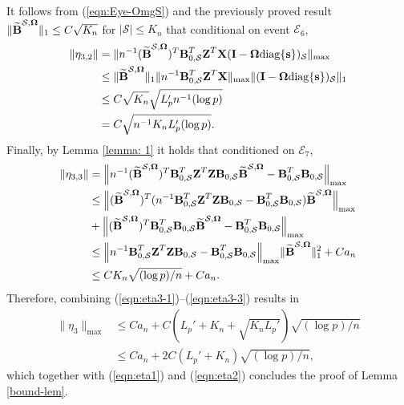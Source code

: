 \documentclass[11pt]{article}
\newcommand{\bs}{\mbox{\bf s}}
\newcommand{\bB}{\mbox{\bf B}}
\newcommand{\bI}{\mbox{\bf I}}
\newcommand{\bX}{\mbox{\bf X}}
\newcommand{\bZ}{\mbox{\bf Z}}
\newcommand{\bOmg}{\mbox{\boldmath $\Omega$}}
\newcommand{\sbOmg}{\mbox{\scriptsize\boldmath $\Omega$}}
\newcommand{\diag}{\mathrm{diag}}
\begin{document}
It follows from (\ref{eqn:Eye-OmgS}) and the previously proved result $\| \widetilde{\bB}^{\mathcal{S}, \sbOmg} \|_{1}
\le C \sqrt{K_n}$ for $|\mathcal{S}| \le K_n$ that conditional on event $\mathcal{E}_{6}$,
\begin{align}
\| \eta_{3,2}\| & = \| n^{-1} ( \widetilde{\bB}^{\mathcal{S}, \sbOmg} )^{T} \bB_{0,\mathcal{S}}^{T} \bZ^{T} \bX( \bI- \bOmg\diag\{\bs\})_{\mathcal S} \|_{\max}
\nonumber \\
& \leq
\|  \widetilde{\bB}^{\mathcal{S}, \sbOmg} \|_{1}
\| n^{-1} \bB_{0,\mathcal{S}}^{T} \bZ^{T} \bX \|_{\max}
\| ( \bI- \bOmg\diag\{\bs\})_{\mathcal S} \|_{1}
\nonumber \\
& \leq
C \sqrt{K_n} \sqrt{ L_p'n^{-1} (\log p)}
\nonumber \\
& =
C  \sqrt{n^{-1} K_n L_p'(\log p)}. \label{eqn:eta3-2}
\end{align}
Finally, by Lemma \ref{lemma: 1} it holds that conditioned on $\mathcal{E}_{7}$,
\begin{align}
\| \eta_{3,3}\| & =  \Big\| n^{-1}
( \widetilde{\bB}^{\mathcal{S}, \sbOmg} )^{T} \bB_{0,\mathcal{S}}^{T} \bZ^{T} \bZ\bB_{0,\mathcal{S}}\widetilde{\bB}^{\mathcal{S}, \sbOmg} - \bB_{0,\mathcal{S}}^T \bB_{0,\mathcal{S}} \Big\|_{\max}
\nonumber \\
& \leq
\Big\|
( \widetilde{\bB}^{\mathcal{S}, \sbOmg} )^{T}
(n^{-1} \bB_{0,\mathcal{S}}^{T} \bZ^{T} \bZ \bB_{0,\mathcal{S}} - \bB_{0,\mathcal{S}}^T \bB_{0,\mathcal{S}}) \widetilde{\bB}^{\mathcal{S}, \sbOmg} \Big\|_{\max}
\nonumber \\ & +
\Big\|
( \widetilde{\bB}^{\mathcal{S}, \sbOmg} )^{T} \bB_{0,\mathcal{S}}^{T} \bB_{0,\mathcal{S}}\widetilde{\bB}^{\mathcal{S}, \sbOmg} - \bB_{0,\mathcal{S}}^T \bB_{0,\mathcal{S}} \Big\|_{\max}
\nonumber \\
& \leq
\Big\|
n^{-1} \bB_{0,\mathcal{S}}^{T} \bZ^{T} \bZ \bB_{0,\mathcal{S}} - \bB_{0,\mathcal{S}}^T \bB_{0,\mathcal{S}} \Big\|_{\max}
\| \widetilde{\bB}^{\mathcal{S}, \sbOmg} \|_{1}^{2}
+ C a_{n}
\nonumber \\
& \leq
C  K_n\sqrt{(\log p)/n}
+ C a_{n}. \label{eqn:eta3-3}
\end{align}
Therefore, combining (\ref{eqn:eta3-1})--(\ref{eqn:eta3-3}) results in
\begin{align*}
\| \eta_{3} \|_{\max} & \leq Ca_n + C(L_{p}' + K_n + \sqrt{K_nL_p'}) \sqrt{(\log p)/n} \\
& \leq  Ca_n + 2C(L_{p}' + K_n) \sqrt{(\log p)/n},
\end{align*}
which together with (\ref{eqn:eta1}) and (\ref{eqn:eta2}) concludes the proof of Lemma \ref{bound-lem}.
\end{document}
